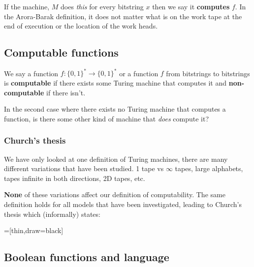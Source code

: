 \documentclass{article}
\begin{document}
If the machine, $M$ does \textit{this} for every bitstring $x$ then we say it \textbf{computes} $f$. In the Arora-Barak definition, it does not matter what is on the work tape at the end of execution or the location of the work heads.

\subsection{Computable functions}

We say a function $f : \{ 0,1 \} ^{*} \rightarrow \{ 0,1 \} ^{*}$ or a function $f$ from bitstrings to bitstrings is \textbf{computable} if there exists some Turing machine that computes it and \textbf{non-computable} if there isn't.

In the second case where there exists no Turing machine that computes a function, is there some other kind of machine that \textit{does} compute it?

\subsubsection{Church's thesis}

We have only looked at one definition of Turing machines, there are many different variations that have been studied. 1 tape vs $\infty$ tapes, large alphabets, tapes infinite in both directions, 2D tapes, etc.

\textbf{None} of these variations affect our definition of computability. The same definition holds for all models that have been investigated, leading to Church's thesis which (informally) states:


=[thin,draw=black]
\begin{center}
\end{center}

\subsection{Boolean functions and language}
\end{document}
